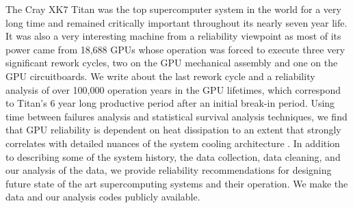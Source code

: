 
The Cray XK7 Titan was the top supercomputer system in the world for a
very long time and remained critically important throughout its nearly
seven year life. It was also a very interesting machine from a
reliability viewpoint as most of its power came from 18,688 GPUs whose
operation was forced to execute three very significant rework cycles,
two on the GPU mechanical assembly and one on the GPU
circuitboards. We write about the last rework cycle and a reliability
analysis of over 100,000 operation years in the GPU lifetimes, which
correspond to Titan's 6 year long productive period after an initial
break-in period. Using time between failures analysis and statistical
survival analysis techniques, we find that GPU reliability is
dependent on heat dissipation to an extent that strongly correlates
with detailed nuances of the system cooling architecture . In addition to describing some of the system history, the
data collection, data cleaning, and our analysis of the data, we
provide reliability recommendations for designing future state of the
art supercomputing systems and their operation. We make the data and
our analysis codes publicly available.
